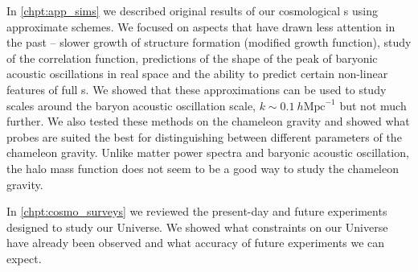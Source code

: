 In \autoref{chpt:app_sims} we described original results of our cosmological \nbodysim s using approximate schemes. We focused on aspects that have drawn less attention in the past -- slower growth of structure formation (modified growth function), study of the correlation function, predictions of the shape of the peak of baryonic acoustic oscillations in real space and the ability to predict certain non-linear features of full \nbodysim s. We showed that these approximations can be used to study scales around the baryon acoustic oscillation scale, $k\sim 0.1~h\text{Mpc}^{-1}$ but not much further. We also tested these methods on the chameleon gravity and showed what probes are suited the best for distinguishing between different parameters of the chameleon gravity. Unlike matter power spectra and baryonic acoustic oscillation, the halo mass function does not seem to be a good way to study the chameleon gravity.

In \autoref{chpt:cosmo_surveys} we reviewed the present-day and future experiments designed to study our Universe. We showed what constraints on our Universe have already been observed and what accuracy of future experiments we can expect.

